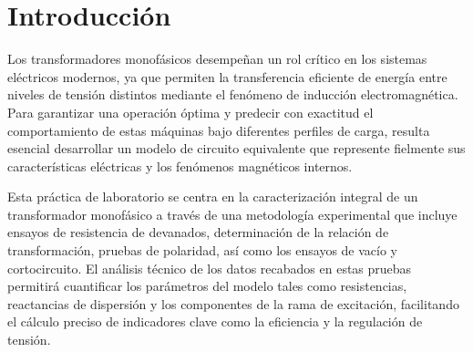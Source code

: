 \section{Introducción}


Los transformadores monofásicos desempeñan un rol crítico en los sistemas eléctricos modernos, ya que permiten la transferencia eficiente de energía entre niveles de tensión distintos mediante el fenómeno de inducción electromagnética. Para garantizar una operación óptima y predecir con exactitud el comportamiento de estas máquinas bajo diferentes perfiles de carga, resulta esencial desarrollar un modelo de circuito equivalente que represente fielmente sus características eléctricas y los fenómenos magnéticos internos.

Esta práctica de laboratorio se centra en la caracterización integral de un transformador monofásico a través de una metodología experimental que incluye ensayos de resistencia de devanados, determinación de la relación de transformación, pruebas de polaridad, así como los ensayos de vacío y cortocircuito. El análisis técnico de los datos recabados en estas pruebas permitirá cuantificar los parámetros del modelo tales como resistencias, reactancias de dispersión y los componentes de la rama de excitación, facilitando el cálculo preciso de indicadores clave como la eficiencia y la regulación de tensión.

